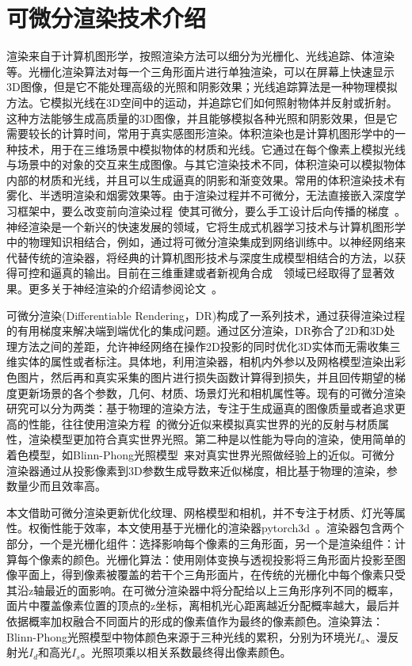 %
%
\section{可微分渲染技术介绍}
渲染来自于计算机图形学，按照渲染方法可以细分为光栅化、光线追踪、体渲染等。光栅化渲染算法对每一个三角形面片进行单独渲染，可以在屏幕上快速显示3D图像，但是它不能处理高级的光照和阴影效果；光线追踪算法是一种物理模拟方法。它模拟光线在3D空间中的运动，并追踪它们如何照射物体并反射或折射。这种方法能够生成高质量的3D图像，并且能够模拟各种光照和阴影效果，但是它需要较长的计算时间，常用于真实感图形渲染。体积渲染也是计算机图形学中的一种技术，用于在三维场景中模拟物体的材质和光线。它通过在每个像素上模拟光线与场景中的对象的交互来生成图像。与其它渲染技术不同，体积渲染可以模拟物体内部的材质和光线，并且可以生成逼真的阴影和渐变效果。常用的体积渲染技术有雾化、半透明渲染和烟雾效果等。由于渲染过程并不可微分，无法直接嵌入深度学习框架中，要么改变前向渲染过程~\cite{ShichenLiu2019SoftRA}使其可微分，要么手工设计后向传播的梯度~\cite{HiroharuKato2017Neural3M}。神经渲染是一个新兴的快速发展的领域，它将生成式机器学习技术与计算机图形学中的物理知识相结合，例如，通过将可微分渲染集成到网络训练中。以神经网络来代替传统的渲染器，将经典的计算机图形技术与深度生成模型相结合的方法，以获得可控和逼真的输出。目前在三维重建\cite{yariv2020multiview}或者新视角合成~\cite{mildenhall2021nerf}~\cite{zhang2020nerf++}领域已经取得了显著效果。更多关于神经渲染的介绍请参阅论文~\cite{tewari2020state}。\par
可微分渲染(Differentiable Rendering，DR)构成了一系列技术，通过获得渲染过程的有用梯度来解决端到端优化的集成问题。通过区分渲染，DR弥合了2D和3D处理方法之间的差距，允许神经网络在操作2D投影的同时优化3D实体而无需收集三维实体的属性或者标注。具体地，利用渲染器，相机内外参以及网格模型渲染出彩色图片，然后再和真实采集的图片进行损失函数计算得到损失，并且回传期望的梯度更新场景的各个参数，几何、材质、场景灯光和相机属性等。现有的可微分渲染研究可以分为两类：基于物理的渲染方法，专注于生成逼真的图像质量或者追求更高的性能，往往使用渲染方程~\cite{kajiya1986rendering}的微分近似来模拟真实世界的光的反射与材质属性，渲染模型更加符合真实世界光照。第二种是以性能为导向的渲染，使用简单的着色模型，如Blinn-Phong光照模型~\cite{blinn1977models}来对真实世界光照做经验上的近似。可微分渲染器通过从投影像素到3D参数生成导数来近似梯度，相比基于物理的渲染，参数量少而且效率高。\par
本文借助可微分渲染更新优化纹理、网格模型和相机，并不专注于材质、灯光等属性。权衡性能于效率，本文使用基于光栅化的渲染器pytorch3d~\cite{ravi2020pytorch3d}。渲染器包含两个部分，一个是光栅化组件：选择影响每个像素的三角形面，另一个是渲染组件：计算每个像素的颜色。光栅化算法：使用刚体变换与透视投影将三角形面片投影至图像平面上，得到像素被覆盖的若干个三角形面片，在传统的光栅化中每个像素只受其沿z轴最近的面影响。在可微分渲染器中将分配给以上三角形序列不同的概率，面片中覆盖像素位置的顶点的z坐标，离相机光心距离越近分配概率越大，最后并依据概率加权融合不同面片的形成的像素值作为最终的像素颜色。渲染算法：Blinn-Phong光照模型中物体颜色来源于三种光线的累积，分别为环境光$I_a$、漫反射光$I_d$和高光$I_s$。光照项乘以相关系数最终得出像素颜色。
